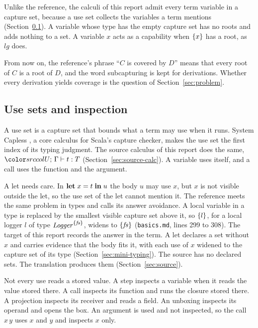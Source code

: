 Unlike the reference, the calculi of this report admit every term variable in a capture set, because a use set collects the variables a term mentions (Section~\ref{sec:cc-uses}). A variable whose type has the empty capture set has no roots and adds nothing to a set. A variable $x$ acts as a capability when $\{x\}$ has a root, as $\mathit{lg}$ does.

From now on, the reference's phrase ``$C$ is covered by $D$'' means that every root of $C$ is a root of $D$, and the word subcapturing is kept for derivations. Whether every derivation yields coverage is the question of Section~\ref{sec:problem}.

\subsection{Use sets and inspection}\label{sec:cc-uses}

A use set is a capture set that bounds what a term may use when it runs. System Capless \cite{xu2025box}, a core calculus for Scala's capture checker, makes the use set the first index of its typing judgment. The source calculus of this report does the same, $\dtyuj{U}{\Gamma}{t}{T}$ (Section~\ref{sec:source-calc}). A variable uses itself, and a call uses the function and the argument.

A let needs care. In $\mathbf{let}\; x = t \;\mathbf{in}\; u$ the body $u$ may use $x$, but $x$ is not visible outside the let, so the use set of the let cannot mention it. The reference meets the same problem in types and calls its answer avoidance. A local variable in a type is replaced by the smallest visible capture set above it, so $\{l\}$, for a local logger $l$ of type $\mathit{Logger}^{\{\mathit{fs}\}}$, widens to $\{\mathit{fs}\}$ (\texttt{basics.md}, lines 299 to 308). The target of this report records the answer in the term. A let declares a set without $x$ and carries evidence that the body fits it, with each use of $x$ widened to the capture set of its type (Section~\ref{sec:mini-typing}). The source has no declared sets. The translation produces them (Section~\ref{sec:source}).

Not every use reads a stored value. A step inspects a variable when it reads the value stored there. A call inspects its function and runs the closure stored there. A projection inspects its receiver and reads a field. An unboxing inspects its operand and opens the box. An argument is used and not inspected, so the call $x\,y$ uses $x$ and $y$ and inspects $x$ only.

